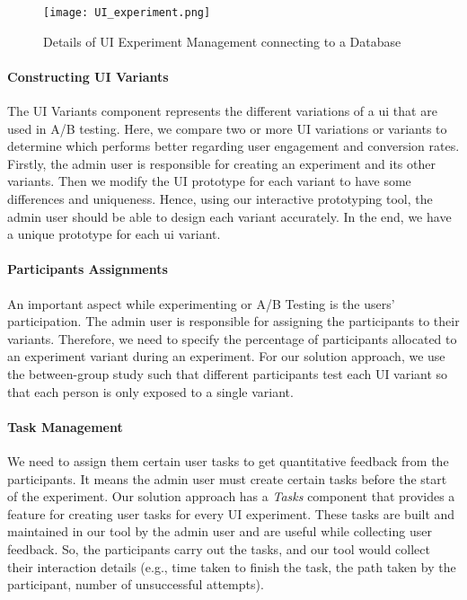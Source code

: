 \begin{figure}[htbp!]
    \centering    
    \texttt{[image: UI\_experiment.png]} 
    \caption[Details of UI Experiment Management]{Details of UI Experiment Management connecting to a Database}
    \label{fig:sc:experiments}
\end{figure}

\paragraph{Constructing UI Variants}
The UI Variants component represents the different variations of a \ac{ui} that are used in A/B testing. 
Here, we compare two or more UI variations or variants to determine which performs better regarding user engagement and conversion rates. 
Firstly, the admin user is responsible for creating an experiment and its other variants. 
Then we modify the UI prototype for each variant to have some differences and uniqueness. 
Hence, using our interactive prototyping tool, the admin user should be able to design each variant accurately.
In the end, we have a unique prototype for each \ac{ui} variant.

\paragraph{Participants Assignments}
An important aspect while experimenting or A/B Testing is the users' participation. 
The admin user is responsible for assigning the participants to their variants. 
Therefore, we need to specify the percentage of participants allocated to an experiment variant during an experiment. 
For our solution approach, we use the between-group study such that different participants test each UI variant so that each person is only exposed to a single variant. 

\paragraph{Task Management}
We need to assign them certain user tasks to get quantitative feedback from the participants. 
It means the admin user must create certain tasks before the start of the experiment.
Our solution approach has a \textit{Tasks} component that provides a feature for creating user tasks for every UI experiment. 
These tasks are built and maintained in our tool by the admin user and are useful while collecting user feedback. 
So, the participants carry out the tasks, and our tool would collect their interaction details (e.g., time taken to finish the task, the path taken by the participant, number of unsuccessful attempts). 

